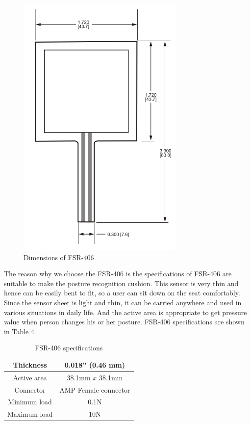 \documentclass[conference]{IEEEtran}
\begin{document}
\begin{figure}[H]
\begin{center}
    \includegraphics[scale=0.6]{img_06.png}
    \caption{Dimensions of FSR-406} 
\end{center}
\end{figure}

The reason why we choose the FSR-406 is the specifications of FSR-406 are suitable to make the posture recognition cushion. This sensor is very thin and hence can be easily bent to fit, so a user can sit down on the seat comfortably. Since the sensor sheet is light and thin, it can be carried anywhere and used in various situations in daily life. And the active area is appropriate to get pressure value when person changes his or her posture. FSR-406 specifications are shown in Table 4.

 \begin{table}[h]
{\renewcommand\arraystretch{1.25}
\caption{FSR-406 specifications}
\begin{tabular}{|c|cc}  \hline\hline
Thickness& \multicolumn{2}{p{6cm}|}{\raggedright 0.018'' (0.46 mm)} \\ \hline
Active area& \multicolumn{2}{p{6cm}|}{\raggedright 38.1mm $x$ 38.1mm} \\ \hline
Connector& \multicolumn{2}{p{6cm}|}{\raggedright AMP Female connector} \\ \hline
Minimum load& \multicolumn{2}{p{6cm}|}{\raggedright 0.1N} \\ \hline
Maximum load& \multicolumn{2}{p{6cm}|}{\raggedright 10N} \\ \hline \hline
\end{tabular}}
\end{table}
\end{document}
